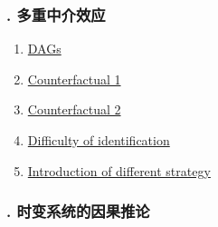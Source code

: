 \documentclass[11pt]{article}
\begin{document}
\vspace{-1cm}

\subsubsection*{. 多重中介效应}

\vspace{-0.5cm}

\begin{multicols}{2}
	\begin{enumerate}
		\item \href{https://mp.weixin.qq.com/s/6-TvJrRUcluUYCzGwgluKA}{DAGs}	%
		\item \href{https://mp.weixin.qq.com/s/RMfV5z9WIxsswops8HLKng}{Counterfactual 1}	%
		\item \href{https://mp.weixin.qq.com/s/EKEqsaAx_RmQDJlFy9vsmw}{Counterfactual 2}	%
		\item \href{https://mp.weixin.qq.com/s/5k5HY6pT6tnrAW4gFVRVKw}{Difficulty of identification}	%
		\item \href{https://mp.weixin.qq.com/s/n-mpLQk9pysPWUrSz26TVg}{Introduction of different strategy}	%
	\end{enumerate}
\end{multicols}



\vspace{-1cm}

\subsubsection*{. 时变系统的因果推论}

\vspace{-0.5cm}
\end{document}
